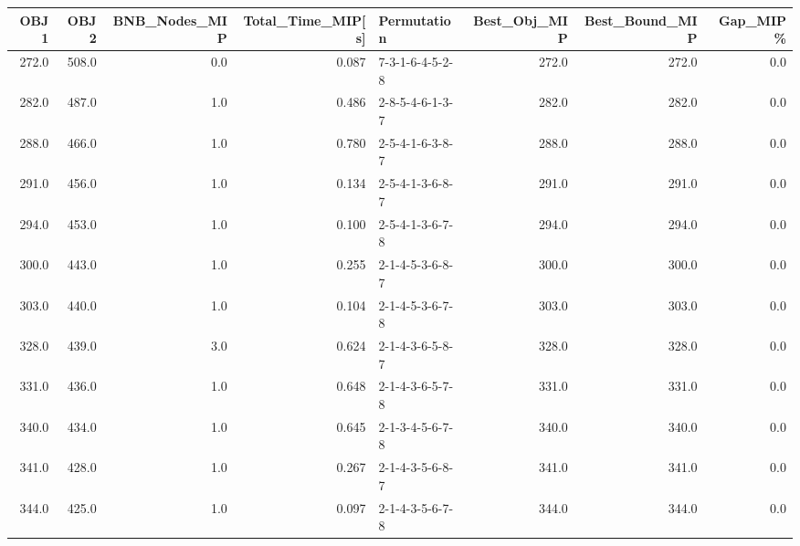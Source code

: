 \begin{tabular}{rrrrlrrr}
\toprule
  OBJ1 &   OBJ2 &  BNB\_Nodes\_MIP &  Total\_Time\_MIP[s] &      Permutation &  Best\_Obj\_MIP &  Best\_Bound\_MIP &  Gap\_MIP\% \\
\midrule
 272.0 &  508.0 &            0.0 &              0.087 &  7-3-1-6-4-5-2-8 &         272.0 &           272.0 &       0.0 \\
 282.0 &  487.0 &            1.0 &              0.486 &  2-8-5-4-6-1-3-7 &         282.0 &           282.0 &       0.0 \\
 288.0 &  466.0 &            1.0 &              0.780 &  2-5-4-1-6-3-8-7 &         288.0 &           288.0 &       0.0 \\
 291.0 &  456.0 &            1.0 &              0.134 &  2-5-4-1-3-6-8-7 &         291.0 &           291.0 &       0.0 \\
 294.0 &  453.0 &            1.0 &              0.100 &  2-5-4-1-3-6-7-8 &         294.0 &           294.0 &       0.0 \\
 300.0 &  443.0 &            1.0 &              0.255 &  2-1-4-5-3-6-8-7 &         300.0 &           300.0 &       0.0 \\
 303.0 &  440.0 &            1.0 &              0.104 &  2-1-4-5-3-6-7-8 &         303.0 &           303.0 &       0.0 \\
 328.0 &  439.0 &            3.0 &              0.624 &  2-1-4-3-6-5-8-7 &         328.0 &           328.0 &       0.0 \\
 331.0 &  436.0 &            1.0 &              0.648 &  2-1-4-3-6-5-7-8 &         331.0 &           331.0 &       0.0 \\
 340.0 &  434.0 &            1.0 &              0.645 &  2-1-3-4-5-6-7-8 &         340.0 &           340.0 &       0.0 \\
 341.0 &  428.0 &            1.0 &              0.267 &  2-1-4-3-5-6-8-7 &         341.0 &           341.0 &       0.0 \\
 344.0 &  425.0 &            1.0 &              0.097 &  2-1-4-3-5-6-7-8 &         344.0 &           344.0 &       0.0 \\
\bottomrule
\end{tabular}
